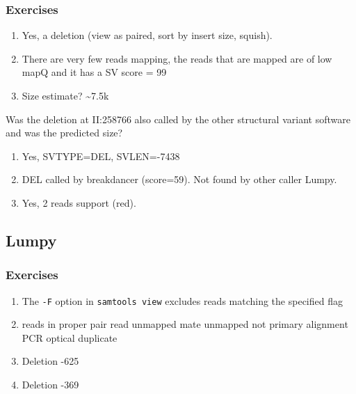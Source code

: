 \documentclass[11pt]{article}
\begin{document}
\hypertarget{exercises-1}{%
\subsubsection{Exercises}\label{exercises-1}}

\begin{enumerate}
\def\labelenumi{\arabic{enumi}.}
\item
  Yes, a deletion (view as paired, sort by insert size, squish).
\item
  There are very few reads mapping, the reads that are mapped are of low
  mapQ and it has a SV score = 99
\item
  Size estimate? \textasciitilde7.5k
\end{enumerate}

Was the deletion at II:258766 also called by the other structural
variant software and was the predicted size?

\begin{enumerate}
\def\labelenumi{\arabic{enumi}.}
\setcounter{enumi}{4}
\item
  Yes, SVTYPE=DEL, SVLEN=-7438
\item
  DEL called by breakdancer (score=59). Not found by other caller Lumpy.
\item
  Yes, 2 reads support (red).
\end{enumerate}

\hypertarget{lumpy}{%
\subsection{Lumpy}\label{lumpy}}

\hypertarget{exercises-2}{%
\subsubsection{Exercises}\label{exercises-2}}

\begin{enumerate}
\def\labelenumi{\arabic{enumi}.}
\item
  The \texttt{-F} option in \texttt{samtools\ view} excludes reads
  matching the specified flag
\item
  reads in proper pair \textbar{} read unmapped \textbar{} mate unmapped
  \textbar{} not primary alignment \textbar{} PCR optical duplicate
\item
  Deletion -625
\item
  Deletion -369
\end{enumerate}
\end{document}

